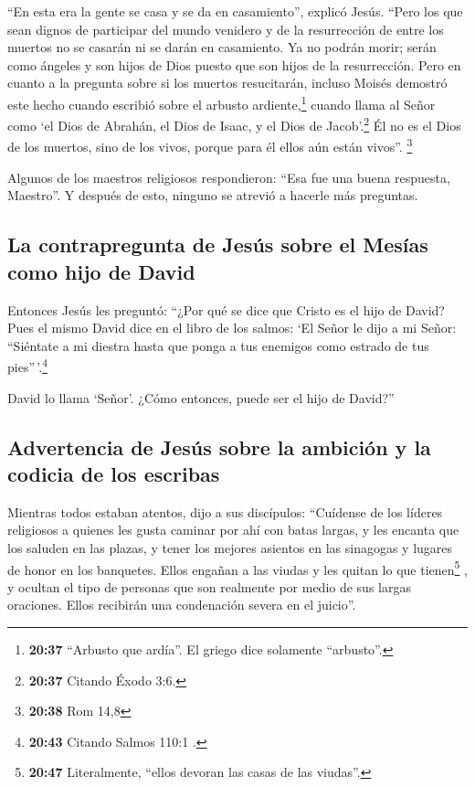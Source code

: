  ``En esta era la gente se casa y se da en casamiento'',
explicó Jesús.  ``Pero los que sean dignos de participar
del mundo venidero y de la resurrección de entre los muertos no se
casarán ni se darán en casamiento.  Ya no podrán morir;
serán como ángeles y son hijos de Dios puesto que son hijos de la
resurrección.  Pero en cuanto a la pregunta sobre si los
muertos resucitarán, incluso Moisés demostró este hecho cuando escribió
sobre el arbusto ardiente,\footnote{\textbf{20:37} ``Arbusto que
  ardía''. El griego dice solamente ``arbusto''.} cuando llama al Señor
como `el Dios de Abrahán, el Dios de Isaac, y el Dios de
Jacob'.\footnote{\textbf{20:37} Citando Éxodo 3:6.}  Él
no es el Dios de los muertos, sino de los vivos, porque para él ellos
aún están vivos''. \footnote{\textbf{20:38} Rom 14,8}

 Algunos de los maestros religiosos respondieron: ``Esa
fue una buena respuesta, Maestro''.  Y después de esto,
ninguno se atrevió a hacerle más preguntas.

\hypertarget{la-contrapregunta-de-jesuxfas-sobre-el-mesuxedas-como-hijo-de-david}{%
\subsection{La contrapregunta de Jesús sobre el Mesías como hijo de
David}\label{la-contrapregunta-de-jesuxfas-sobre-el-mesuxedas-como-hijo-de-david}}

 Entonces Jesús les preguntó: ``¿Por qué se dice que
Cristo es el hijo de David?  Pues el mismo David dice en
el libro de los salmos: `El Señor le dijo a mi Señor: ``Siéntate a mi
diestra  hasta que ponga a tus enemigos como estrado de
tus pies''\,'.\footnote{\textbf{20:43} Citando Salmos 110:1 .}

 David lo llama `Señor'. ¿Cómo entonces, puede ser el
hijo de David?''

\hypertarget{advertencia-de-jesuxfas-sobre-la-ambiciuxf3n-y-la-codicia-de-los-escribas}{%
\subsection{Advertencia de Jesús sobre la ambición y la codicia de los
escribas}\label{advertencia-de-jesuxfas-sobre-la-ambiciuxf3n-y-la-codicia-de-los-escribas}}

 Mientras todos estaban atentos, dijo a sus discípulos:
 ``Cuídense de los líderes religiosos a quienes les gusta
caminar por ahí con batas largas, y les encanta que los saluden en las
plazas, y tener los mejores asientos en las sinagogas y lugares de honor
en los banquetes.  Ellos engañan a las viudas y les
quitan lo que tienen\footnote{\textbf{20:47} Literalmente, ``ellos
  devoran las casas de las viudas''.} , y ocultan el tipo de personas
que son realmente por medio de sus largas oraciones. Ellos recibirán una
condenación severa en el juicio''.

